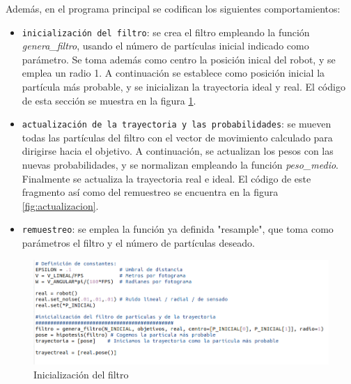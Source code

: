 Además, en el programa principal se codifican los siguientes comportamientos:
\begin{itemize}
  \item \texttt{inicialización del filtro}: se crea el filtro empleando la función \textit{genera\_filtro}, usando el número de partículas inicial indicado como parámetro. Se toma además como centro la posición inical del robot, y se emplea un radio 1.
A continuación se establece como posición inicial la partícula más probable, y se inicializan la trayectoria ideal y real. El código de esta sección se muestra en la figura \ref{fig:inicializacion}.
  \item \texttt{actualización de la trayectoria y las probabilidades}: se mueven todas las partículas del filtro con el vector de movimiento calculado para dirigirse hacia el objetivo. A continuación,
se actualizan los pesos con las nuevas probabilidades, y se normalizan empleando la función \textit{peso\_medio}. Finalmente se actualiza la trayectoria real e ideal. El código de este fragmento así como 
del remuestreo se encuentra en la figura \ref{fig:actualizacion}.
  \item \texttt{remuestreo}: se emplea la función ya definida "resample", que toma como parámetros el filtro y el número de partículas deseado. 
\end{itemize}
\begin{figure}[htb]
  \centering
  \includegraphics[width=1\linewidth]{images/filtroc4.png}
  \caption{Inicialización del filtro} 
  \label{fig:inicializacion}
\end{figure}
